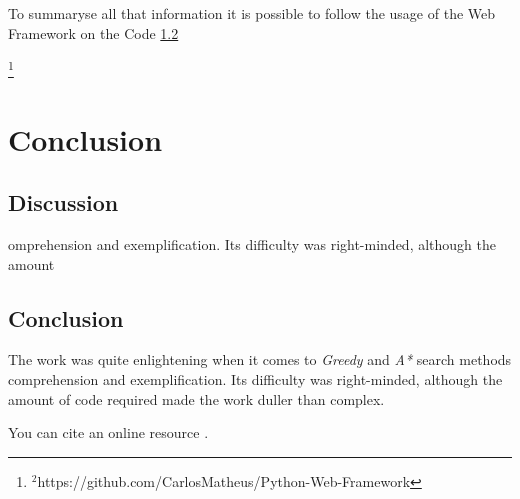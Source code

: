 \documentclass[journal,12pt,onecolumn,draftclsnofoot,]{IEEEtran}
\newcommand\blfootnote[1]{%
  \begingroup
  \renewcommand\thefootnote{}\footnote{#1}%
  \addtocounter{footnote}{-1}%
  \endgroup
}
\let\i\textit
\begin{document}
To summaryse all that information it is possible to follow the usage of the Web Framework on the Code \ref{}





\blfootnote{$^2$https://github.com/CarlosMatheus/Python-Web-Framework}

\section{Conclusion}

\subsection{Discussion}
 omprehension and exemplification. Its difficulty was right-minded, although the amount
\subsection{Conclusion}
The work was quite enlightening when it comes to \i{Greedy} and \i{A*} search methods comprehension and exemplification. Its difficulty was right-minded, although the amount of code required made the work duller than complex.




You can cite an online resource \cite{ford}.

\printbibliography


\vfill
\end{document}
